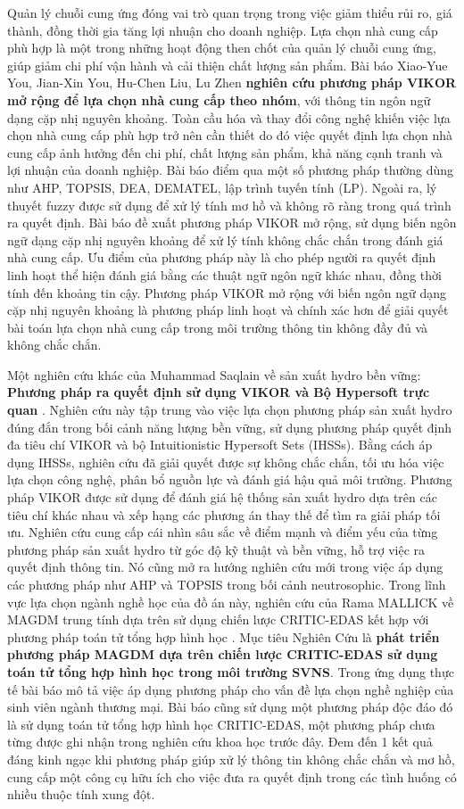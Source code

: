 Quản lý chuỗi cung ứng đóng vai trò quan trọng trong việc giảm thiểu rủi ro, giá thành, đồng thời gia tăng lợi nhuận cho doanh nghiệp. Lựa chọn nhà cung cấp phù hợp là một trong những hoạt động then chốt của quản lý chuỗi cung ứng, giúp giảm chi phí vận hành và cải thiện chất lượng sản phẩm. Bài báo Xiao-Yue You, Jian-Xin You, Hu-Chen Liu, Lu Zhen \textbf{nghiên cứu phương pháp VIKOR mở rộng để lựa chọn nhà cung cấp theo nhóm}, với thông tin ngôn ngữ dạng cặp nhị nguyên khoảng. Toàn cầu hóa và thay đổi công nghệ khiến việc lựa chọn nhà cung cấp phù hợp trở nên cần thiết do đó  việc quyết định lựa chọn nhà cung cấp ảnh hưởng đến chi phí, chất lượng sản phẩm, khả năng cạnh tranh và lợi nhuận của doanh nghiệp. Bài báo điểm qua một số phương pháp thường dùng như AHP, TOPSIS, DEA, DEMATEL, lập trình tuyến tính (LP). Ngoài ra, lý thuyết fuzzy được sử dụng để xử lý tính mơ hồ và không rõ ràng trong quá trình ra quyết định. Bài báo đề xuất phương pháp VIKOR mở rộng, sử dụng biến ngôn ngữ dạng cặp nhị nguyên khoảng để xử lý tính không chắc chắn trong đánh giá nhà cung cấp. Ưu điểm của phương pháp này là cho phép người ra quyết định linh hoạt thể hiện đánh giá bằng các thuật ngữ ngôn ngữ khác nhau, đồng thời tính đến khoảng tin cậy. Phương pháp VIKOR mở rộng với biến ngôn ngữ dạng cặp nhị nguyên khoảng là phương pháp linh hoạt và chính xác hơn để giải quyết bài toán lựa chọn nhà cung cấp trong môi trường thông tin không đầy đủ và không chắc chắn.

Một nghiên cứu khác của Muhammad Saqlain về sản xuất hydro bền vững: \textbf{Phương pháp ra quyết định sử dụng VIKOR và Bộ Hypersoft trực quan} \cite{muhammad}. Nghiên cứu này tập trung vào việc lựa chọn phương pháp sản xuất hydro đúng đắn trong bối cảnh năng lượng bền vững, sử dụng phương pháp quyết định đa tiêu chí VIKOR và bộ Intuitionistic Hypersoft Sets (IHSSs). Bằng cách áp dụng IHSSs, nghiên cứu đã giải quyết được sự không chắc chắn, tối ưu hóa việc lựa chọn công nghệ, phân bổ nguồn lực và đánh giá hậu quả môi trường. Phương pháp VIKOR được sử dụng để đánh giá hệ thống sản xuất hydro dựa trên các tiêu chí khác nhau và xếp hạng các phương án thay thế để tìm ra giải pháp tối ưu. Nghiên cứu cung cấp cái nhìn sâu sắc về điểm mạnh và điểm yếu của từng phương pháp sản xuất hydro từ góc độ kỹ thuật và bền vững, hỗ trợ việc ra quyết định thông tin. Nó cũng mở ra hướng nghiên cứu mới trong việc áp dụng các phương pháp như AHP và TOPSIS trong bối cảnh neutrosophic.
Trong lĩnh vực lựa chọn ngành nghề học của đồ án này, nghiên cứu của Rama MALLICK về MAGDM trung tính dựa trên sử dụng chiến lược CRITIC-EDAS kết hợp với phương pháp toán tử tổng hợp hình học \cite{rama}. Mục tiêu Nghiên Cứu là \textbf{phát triển phương pháp MAGDM dựa trên chiến lược CRITIC-EDAS sử dụng toán tử tổng hợp hình học trong môi trường SVNS}. Trong ứng dụng thực tế bài báo mô tả việc áp dụng phương pháp cho vấn đề lựa chọn nghề nghiệp của sinh viên ngành thương mại. Bài báo cũng sử dụng một phương pháp độc đáo đó là sử dụng toán tử tổng hợp hình học CRITIC-EDAS, một phương pháp chưa từng được ghi nhận trong nghiên cứu khoa học trước đây. Đem đến 1 kết quả đáng kinh ngạc khi phương pháp giúp xử lý thông tin không chắc chắn và mơ hồ, cung cấp một công cụ hữu ích cho việc đưa ra quyết định trong các tình huống có nhiều thuộc tính xung đột.

